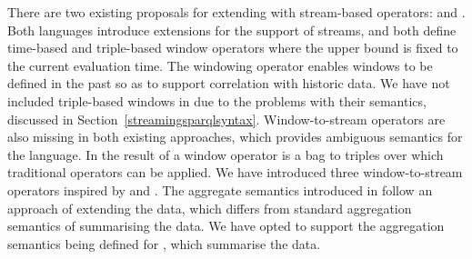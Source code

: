 There are two existing proposals for extending \sparql with stream-based operators: \streamingsparql \cite{Bolles_08} and \csparql \cite{Barbieri2010An-Execution-En}.
Both languages introduce extensions for the support of \rdf streams, and both define time-based and triple-based window operators where the upper bound is fixed to the current evaluation time.
The \sparqlstr windowing operator enables windows to be defined in the past so as to support correlation with historic data. 
We have not included triple-based windows in \sparqlstr due to the problems with their semantics, discussed in Section~\ref{streamingsparqlsyntax}.
Window-to-stream operators are also missing in both existing approaches, which provides ambiguous semantics for the language.
In \sparqlstr the result of a window operator is a bag to triples over which traditional operators can be applied.
We have introduced three window-to-stream operators inspired by \sneeql and \cql.
The aggregate semantics introduced in \csparql follow an approach of extending the data, which differs from standard aggregation semantics of summarising the data.
We have opted to support the aggregation semantics being defined for  \cite{Harris2010SPARQL-1.1-Quer}, which summarise the data.


